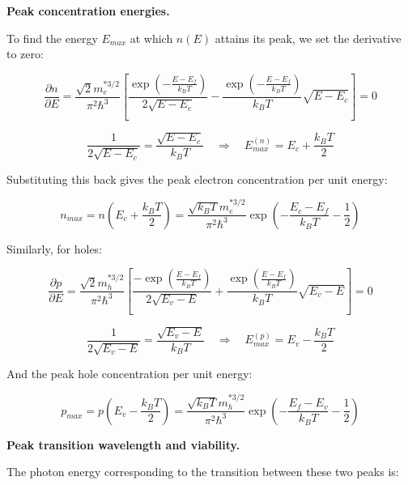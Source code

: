 \textbf{Peak concentration energies.}

To find the energy $E_{max}$ at which $n(E)$ attains its peak, we set the derivative to zero:

\begin{equation*}
  \frac{\partial n}{\partial E} = \frac{\sqrt{2} m_e^{* 3/2}}{\pi^2 \hbar^3} \left[ \frac{\exp\left(-\frac{E-E_f}{k_B T}\right)}{2\sqrt{E-E_c}} - \frac{\exp\left(-\frac{E-E_f}{k_B T}\right)}{k_B T} \sqrt{E-E_c} \right] = 0
\end{equation*}

\begin{equation*}
  \frac{1}{2\sqrt{E-E_c}} = \frac{\sqrt{E-E_c}}{k_B T} \quad\Longrightarrow\quad \boxed{E_{max}^{(n)} = E_c + \frac{k_B T}{2}}
\end{equation*}

Substituting this back gives the peak electron concentration per unit energy:

\begin{equation*}
  n_{max} = n\left(E_c + \frac{k_B T}{2}\right) = \frac{\sqrt{k_B T} m_e^{* 3/2}}{\pi^2 \hbar^3} \exp\left(-\frac{E_c - E_f}{k_B T} - \frac{1}{2}\right)
\end{equation*}

Similarly, for holes:

\begin{equation*}
  \frac{\partial p}{\partial E} = \frac{\sqrt{2} m_h^{* 3/2}}{\pi^2 \hbar^3} \left[ \frac{-\exp\left(\frac{E-E_f}{k_B T}\right)}{2\sqrt{E_v-E}} + \frac{\exp\left(\frac{E-E_f}{k_B T}\right)}{k_B T} \sqrt{E_v-E} \right] = 0
\end{equation*}

\begin{equation*}
  \frac{1}{2\sqrt{E_v-E}} = \frac{\sqrt{E_v-E}}{k_B T} \quad\Longrightarrow\quad \boxed{E_{max}^{(p)} = E_v - \frac{k_B T}{2}}
\end{equation*}

And the peak hole concentration per unit energy:

\begin{equation*}
  p_{max} = p\left(E_v - \frac{k_B T}{2}\right) = \frac{\sqrt{k_B T} m_h^{* 3/2}}{\pi^2 \hbar^3} \exp\left(-\frac{E_f - E_v}{k_B T} - \frac{1}{2}\right)
\end{equation*}

\textbf{Peak transition wavelength and viability.}

The photon energy corresponding to the transition between these two peaks is:

